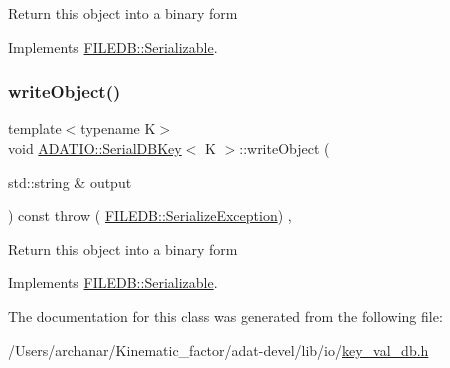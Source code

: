 Return this object into a binary form 

Implements \mbox{\hyperlink{classFILEDB_1_1Serializable_a8deaa86e108c08c863881e46cf5578ea}{F\+I\+L\+E\+D\+B\+::\+Serializable}}.

\mbox{\label{classADATIO_1_1SerialDBKey_a6e2d9bbd18a3fa5e049f0ad5321d328a}} 
\subsubsection{\texorpdfstring{writeObject()}{writeObject()}\hspace{0.1cm}{\footnotesize\ttfamily [3/3]}}
{\footnotesize\ttfamily template$<$typename K$>$ \\
void \mbox{\hyperlink{classADATIO_1_1SerialDBKey}{A\+D\+A\+T\+I\+O\+::\+Serial\+D\+B\+Key}}$<$ K $>$\+::write\+Object (\begin{DoxyParamCaption}\item[{std\+::string \&}]{output }\end{DoxyParamCaption}) const throw ( \mbox{\hyperlink{classFILEDB_1_1SerializeException}{F\+I\+L\+E\+D\+B\+::\+Serialize\+Exception}}) \hspace{0.3cm}{\ttfamily [inline]}, {\ttfamily [virtual]}}

Return this object into a binary form 

Implements \mbox{\hyperlink{classFILEDB_1_1Serializable_a8deaa86e108c08c863881e46cf5578ea}{F\+I\+L\+E\+D\+B\+::\+Serializable}}.



The documentation for this class was generated from the following file\+:\begin{DoxyCompactItemize}
\item 
/\+Users/archanar/\+Kinematic\+\_\+factor/adat-\/devel/lib/io/\mbox{\hyperlink{adat-devel_2lib_2io_2key__val__db_8h}{key\+\_\+val\+\_\+db.\+h}}\end{DoxyCompactItemize}
